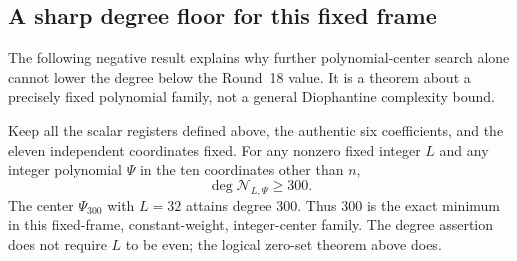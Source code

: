 \subsection{A sharp degree floor for this fixed frame}
The following negative result explains why further polynomial-center search
alone cannot lower the degree below the Round~18 value. It is a theorem
about a precisely fixed polynomial family, not a general Diophantine
complexity bound.

\begin{theorem}\label{thm:degree-floor}
Keep all the scalar registers defined above, the authentic six coefficients,
and the eleven independent coordinates fixed. For any nonzero fixed integer
$L$ and any integer polynomial $\Psi$ in the ten coordinates other than $n$,
\[
 \deg\mathcal N_{L,\Psi}\ge300.
\]
The center $\Psi_{300}$ with $L=32$ attains degree $300$. Thus $300$ is the
exact minimum in this fixed-frame, constant-weight, integer-center family.
The degree assertion does not require $L$ to be even; the logical
zero-set theorem above does.
\end{theorem}
